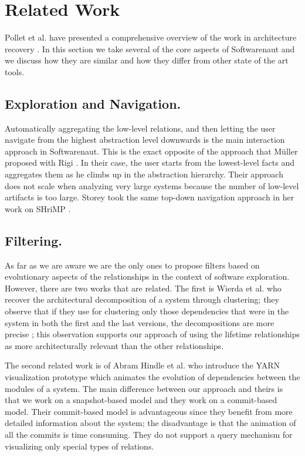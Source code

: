 \documentclass[preprint,12pt]{elsarticle}
\begin{document}
\newpage
\section {Related Work}
\label {sec:rel}

Pollet et al. have presented a comprehensive overview of the work in architecture recovery \cite{pollet-sar}. In this section we take several of the core aspects of Softwarenaut and we discuss how they are similar and how they differ from other state of the art tools.

\subsection {Exploration and Navigation.} Automatically aggregating the low-level relations, and then letting the user navigate from the highest abstraction level downwards is the main interaction approach in Softwarenaut. This is the exact opposite of the approach that M{\"u}ller proposed with Rigi \cite{muller-revengenv}. In their case, the user starts from the lowest-level facts and aggregates them as he climbs up in the abstraction hierarchy. Their approach does not scale when analyzing very large systems because the number of low-level artifacts is too large. Storey took the same top-down navigation approach in her work on SHriMP \cite{storey-shrimp}.

\subsection {Filtering.} 

As far as we are aware we are the only ones to propose filters based on evolutionary aspects of the relationships in the context of software exploration. However, there are two works that are related. The first is Wierda et al. who recover the architectural decomposition of a system through clustering; they observe that if they use for clustering only those dependencies that were in the system in both the first and the last versions, the decompositions are more precise \cite{wierda-clustering}; this observation supports our approach of using the lifetime relationships as more architecturally relevant than the other relationships. 

The second related work is of Abram Hindle et al. \cite{hindle-yarn} who introduce the YARN visualization prototype which animates the evolution of dependencies between the modules of a system. The main difference between our approach and theirs is that we work on a snapshot-based model and they work on a commit-based model. Their commit-based model is advantageous since they benefit from more detailed information about the system; the disadvantage is that the animation of all the commits is time consuming. They do not support a query mechanism for visualizing only special types of relations.
\end{document}
